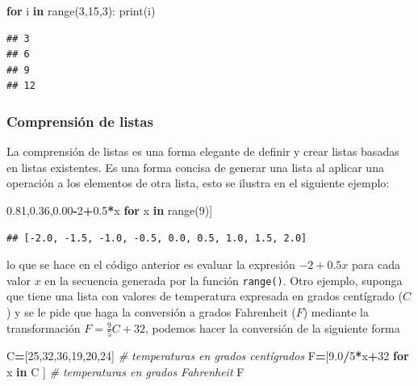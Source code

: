 \documentclass[
]{book}
\newenvironment{Shaded}{\begin{snugshade}}{\end{snugshade}}
\newcommand{\BuiltInTok}[1]{#1}
\newcommand{\CommentTok}[1]{\textcolor[rgb]{0.56,0.35,0.01}{\textit{#1}}}
\newcommand{\ControlFlowTok}[1]{\textcolor[rgb]{0.13,0.29,0.53}{\textbf{#1}}}
\newcommand{\DecValTok}[1]{\textcolor[rgb]{0.00,0.00,0.81}{#1}}
\newcommand{\FloatTok}[1]{\textcolor[rgb]{0.00,0.00,0.81}{#1}}
\newcommand{\KeywordTok}[1]{\textcolor[rgb]{0.13,0.29,0.53}{\textbf{#1}}}
\newcommand{\NormalTok}[1]{#1}
\newcommand{\OperatorTok}[1]{\textcolor[rgb]{0.81,0.36,0.00}{\textbf{#1}}}
\theoremstyle{definition}
\theoremstyle{definition}
\theoremstyle{definition}
\theoremstyle{definition}
\theoremstyle{remark}
\begin{document}
\begin{Shaded}
\begin{Highlighting}[]
\ControlFlowTok{for}\NormalTok{ i }\KeywordTok{in} \BuiltInTok{range}\NormalTok{(}\DecValTok{3}\NormalTok{,}\DecValTok{15}\NormalTok{,}\DecValTok{3}\NormalTok{):}
  \BuiltInTok{print}\NormalTok{(i)}
\end{Highlighting}
\end{Shaded}

\begin{verbatim}
## 3
## 6
## 9
## 12
\end{verbatim}

\hypertarget{ComprensionDeListas}{%
\subsubsection{Comprensión de listas}\label{ComprensionDeListas}}

La comprensión de listas es una forma elegante de definir y crear listas basadas en listas existentes. Es una forma concisa de generar una lista al aplicar una operación a los elementos de otra lista, esto se ilustra en el siguiente ejemplo:

\begin{Shaded}
\begin{Highlighting}[]
\NormalTok{[}\OperatorTok{{-}}\DecValTok{2}\OperatorTok{+}\FloatTok{0.5}\OperatorTok{*}\NormalTok{x }\ControlFlowTok{for}\NormalTok{ x }\KeywordTok{in} \BuiltInTok{range}\NormalTok{(}\DecValTok{9}\NormalTok{)]}
\end{Highlighting}
\end{Shaded}

\begin{verbatim}
## [-2.0, -1.5, -1.0, -0.5, 0.0, 0.5, 1.0, 1.5, 2.0]
\end{verbatim}

lo que se hace en el código anterior es evaluar la expresión \(-2+0.5x\) para cada valor \(x\) en la secuencia generada por la función \texttt{range()}. Otro ejemplo, suponga que tiene una lista con valores de temperatura expresada en grados centígrado (\(C\)) y se le pide que haga la conversión a grados Fahrenheit (\(F\)) mediante la transformación \(F=\frac 9 5 C+32\), podemos hacer la conversión de la siguiente forma

\begin{Shaded}
\begin{Highlighting}[]
\NormalTok{C}\OperatorTok{=}\NormalTok{[}\DecValTok{25}\NormalTok{,}\DecValTok{32}\NormalTok{,}\DecValTok{36}\NormalTok{,}\DecValTok{19}\NormalTok{,}\DecValTok{20}\NormalTok{,}\DecValTok{24}\NormalTok{] }\CommentTok{\# temperaturas en grados centígrados}
\NormalTok{F}\OperatorTok{=}\NormalTok{[}\FloatTok{9.0}\OperatorTok{/}\DecValTok{5}\OperatorTok{*}\NormalTok{x}\OperatorTok{+}\DecValTok{32} \ControlFlowTok{for}\NormalTok{ x }\KeywordTok{in}\NormalTok{ C ] }\CommentTok{\# temperaturas en grados Fahrenheit}
\NormalTok{F}
\end{Highlighting}
\end{Shaded}
\end{document}
